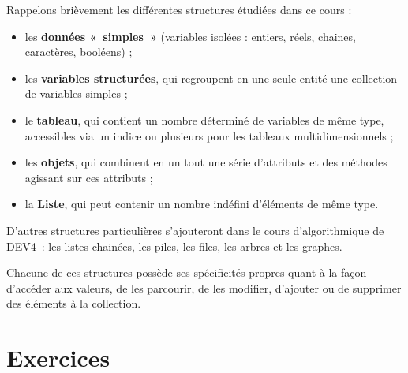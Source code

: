 	Rappelons brièvement les différentes structures étudiées dans ce cours
	 :
	
	\begin{itemize}
		\item 
			les \textbf{données «~simples~»} 
			(variables isolées : entiers, réels, chaines, caractères, booléens) ;
		\item 
			les \textbf{variables structurées}, 
			qui regroupent en une seule entité
			une collection de variables simples ;
		\item 
			le \textbf{tableau}, 
			qui contient un nombre déterminé de variables de même type, 
			accessibles via un indice 
			ou plusieurs pour les tableaux multidimensionnels ;
		\item 
			les \textbf{objets}, 
			qui combinent en un tout une série d’attributs 
			et des méthodes agissant sur ces attributs ;
		\item 
			la \textbf{Liste}, 
			qui peut contenir un nombre indéfini d’éléments de même type.
	\end{itemize}
	
	D’autres structures particulières s’ajouteront 
	dans le cours d'algorithmique de DEV4~: 
	les listes chainées, les piles, les files, les arbres et les graphes.
	
	Chacune de ces structures possède ses spécificités propres quant à la
	façon d’accéder aux valeurs, de les parcourir, de les modifier,
	d’ajouter ou de supprimer des éléments à la collection. 

\clearpage
\section{Exercices}

